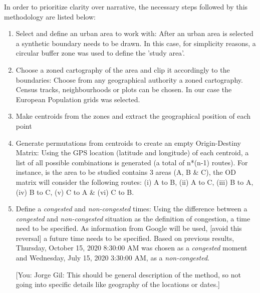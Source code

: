 \documentclass[a4paper]{jpconf}
\begin{document}
	
	In order to prioritize clarity over narrative, the necessary steps followed by this methodology are listed below: 
	\begin{enumerate}[label=\arabic*)]
		\item Select and define an urban area to work with: After an urban area is selected a synthetic boundary needs to be drawn. In this case, for simplicity reasons, a circular buffer zone was used to define the 'study area'.
		\item Choose a zoned cartography of the area and clip it accordingly to the boundaries: Choose from any geographical authority a zoned cartography. Census tracks, neighbourhoods or plots can be chosen. In our case the European Population grids was selected.	
		\item Make centroids from the zones and extract the geographical position of each point
		\item Generate permutations from centroids to create an empty Origin-Destiny Matrix: Using the GPS location (latitude and longitude) of each centroid, a list of all possible combinations is generated (a total of n*(n-1) routes).  For instance, is the area to be studied contains 3 areas (A, B \& C), the OD matrix will consider the following routes: (i) A to B, (ii) A to C, (iii) B to A, (iv) B to C, (v) C to A \& (vi) C to B. 
		\item Define a \textit{congested} and \textit{non-congested} times: Using the difference between a \textit{congested} and \textit{non-congested} situation as the definition of congestion, a time need to be specified. As information from Google will be used, [avoid this reversal] a future time needs to be specified. Based on previous results, Thursday, October 15, 2020 8:30:00 AM was chosen as a \textit{congested} moment and Wednesday, July 15, 2020 3:30:00 AM, as a \textit{non-congested}.\par
		
		[You: Jorge Gil: This should be general description of the method, so not going into specific details like geography of the locations or dates.]\par
		
		

\end{enumerate}
\end{document}
